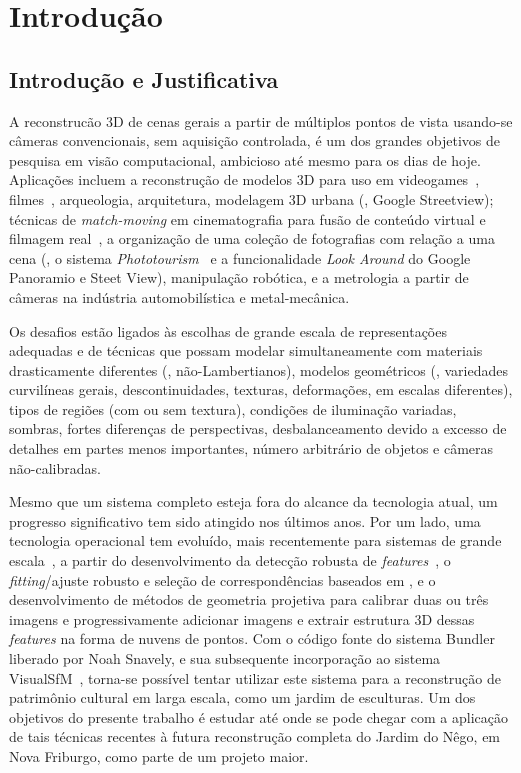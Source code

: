 \chapter{Introdução} \label{cap:intro}

\section*{Introdução e Justificativa}

A reconstrucão 3D de cenas gerais a partir de múltiplos pontos de vista
usando-se câmeras convencionais, sem aquisição controlada, é um dos grandes
objetivos de pesquisa em visão computacional, ambicioso até mesmo para os dias
de hoje. Aplicações incluem a reconstrução de modelos 3D para uso em
videogames~\cite{ablan2007digital}, filmes~\cite{ablan2007digital},
arqueologia, arquitetura, modelagem 3D urbana (\eg, Google Streetview); técnicas
de \emph{match-moving} em cinematografia para fusão de conteúdo virtual e
filmagem real~\cite{dobbert2012matchmoving}, a organização de uma coleção de
fotografias com relação a uma cena (\eg, o sistema
\emph{Phototourism}~\cite{agarwal2010reconstructing} e a funcionalidade
\emph{Look Around} do Google Panoramio e Steet View), manipulação robótica, e a
metrologia a partir de câmeras na indústria automobilística e metal-mecânica.

Os desafios estão ligados às escolhas de grande escala de
representações adequadas e de técnicas que possam modelar simultaneamente com
materiais drasticamente diferentes (\eg, não-Lambertianos), modelos
geométricos (\eg, variedades curvilíneas gerais, descontinuidades, texturas,
deformações, em escalas diferentes), tipos de regiões (com ou sem textura),
condições de iluminação variadas, sombras, fortes diferenças de perspectivas,
desbalanceamento devido a excesso de detalhes em partes menos importantes,
número arbitrário de objetos e câmeras não-calibradas.

Mesmo que um sistema completo esteja fora do alcance da tecnologia atual,
um progresso significativo tem sido atingido nos últimos anos. Por um lado,
uma tecnologia operacional tem evoluído, mais recentemente para sistemas de grande
escala~\cite{agarwal2011building},
a partir do desenvolvimento da detecção robusta de
\emph{features}~\cite{mikolajczyk2002detection}, o
\emph{fitting}/ajuste robusto e seleção de correspondências baseados em \ransac, e o
desenvolvimento de métodos de geometria projetiva para calibrar duas ou três
imagens e progressivamente adicionar imagens e extrair estrutura 3D dessas
\emph{features} na forma de nuvens de pontos. Com o código fonte do sistema
Bundler~\cite{snavely2010bundler} liberado por Noah Snavely, e sua subsequente incorporação
ao sistema VisualSfM~\cite{wu2011visualsfm}, torna-se possível tentar utilizar este sistema para a
reconstrução de patrimônio cultural em larga escala, como um jardim de
esculturas. Um dos objetivos do presente trabalho é estudar até onde se pode
chegar com a aplicação de tais técnicas recentes à futura reconstrução completa do Jardim
do Nêgo, em Nova Friburgo, como parte de um projeto maior.

